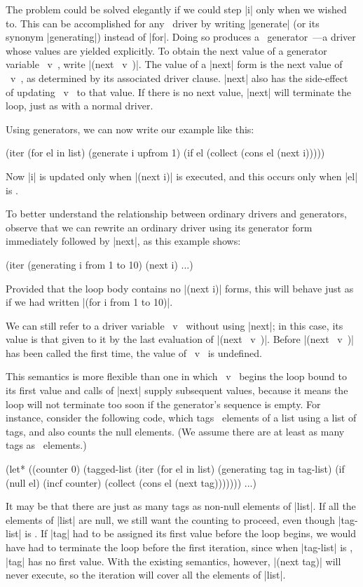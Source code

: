 The problem could be solved elegantly if we could step |i| only when
we wished to.  This
can be accomplished for any \iter\ driver by writing |generate| (or
its synonym |generating|)
instead of |for|.  Doing so produces a ~generator~---a driver whose
values are yielded explicitly.  To obtain the next value of a
generator variable ~v~, write \linebreak |(next ~v~)|.  The value of a |next|
form is the next value of ~v~, as determined by its associated driver
clause.  |next| also has the side-effect of updating ~v~ to that
value.  If there is no next value, |next| will terminate the loop,
just as with a normal driver.


Using generators, we can now write our example like this:
\begin{program}
(iter (for el in list)
      (generate i upfrom 1)
      (if el (collect (cons el (next i)))))
\end{program}
Now |i| is updated only when |(next i)| is executed, and this occurs
only when |el| is \nonnil.

To better understand the relationship between ordinary drivers and
generators, observe that we can rewrite an ordinary driver using its
generator form immediately followed by |next|, as this example shows:
\begin{program}
(iter (generating i from 1 to 10)
      (next i)
      ...)
\end{program}
Provided that the loop body contains no |(next i)| forms, this will
behave just as if we had written |(for i from 1 to 10)|.

We can still refer to a driver variable ~v~ without using |next|; in
this case, its value is that given to it by the last evaluation of
|(next ~v~)|.  Before |(next ~v~)| has been called the first time, the
value of ~v~ is undefined.

This semantics is more flexible than
one in which ~v~ begins the loop bound to its first value and calls
of |next| supply subsequent values, because it means the loop will not
terminate too soon if the generator's sequence is empty.  For
instance, consider the following code, which tags \nonnil\ elements of
a list using a list of tags, and also counts the null elements.
(We assume there are at least as many tags as \nonnil\ elements.)
\begin{program}
(let* ((counter 0)
       (tagged-list (iter (for el in list)
                          (generating tag in tag-list)
                          (if (null el)
                              (incf counter)
                              (collect (cons el (next tag)))))))
  ...)
\end{program}
It may be that there are just as many tags as non-null elements of
|list|.  If all the elements of |list| are null, we still want the
counting to proceed, even though |tag-list| is \nil.  If |tag| had to be
assigned its first value before the loop begins, we would have had to
terminate the loop before the first iteration, since when |tag-list|
is \nil, |tag|
has no first value.  With the existing semantics, however, |(next
tag)| will never execute, so the iteration will cover all the elements of
|list|.

